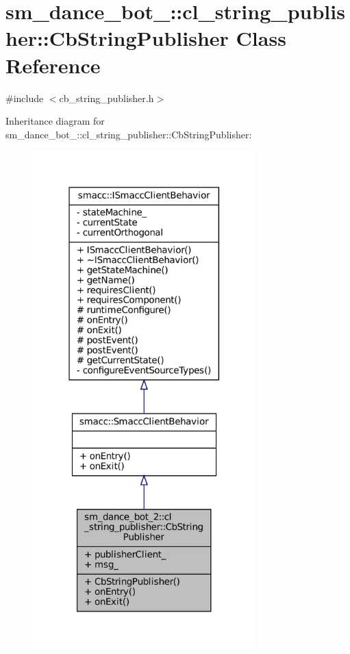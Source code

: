\hypertarget{classsm__dance__bot__2_1_1cl__string__publisher_1_1CbStringPublisher}{}\section{sm\+\_\+dance\+\_\+bot\+\_\+:\+:cl\+\_\+string\+\_\+publisher\+:\+:Cb\+String\+Publisher Class Reference}
\label{classsm__dance__bot__2_1_1cl__string__publisher_1_1CbStringPublisher}


{\ttfamily \#include $<$cb\+\_\+string\+\_\+publisher.\+h$>$}



Inheritance diagram for sm\+\_\+dance\+\_\+bot\+\_\+:\+:cl\+\_\+string\+\_\+publisher\+:\+:Cb\+String\+Publisher\+:
\nopagebreak
\begin{figure}[H]
\begin{center}
\leavevmode
\includegraphics[width=244pt]{classsm__dance__bot__2_1_1cl__string__publisher_1_1CbStringPublisher__inherit__graph}
\end{center}
\end{figure}


